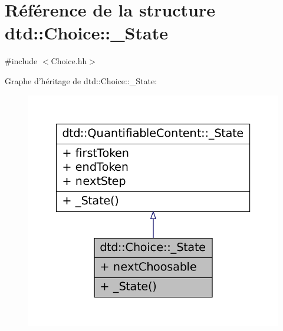 \hypertarget{structdtd_1_1_choice_1_1___state}{
\section{Référence de la structure dtd::Choice::\_\-State}
\label{structdtd_1_1_choice_1_1___state}
}


{\ttfamily \#include $<$Choice.hh$>$}



Graphe d'héritage de dtd::Choice::\_\-State:\nopagebreak
\begin{figure}[H]
\begin{center}
\leavevmode
\includegraphics[width=354pt]{structdtd_1_1_choice_1_1___state__inherit__graph}
\end{center}
\end{figure}


